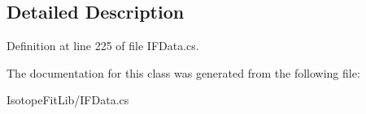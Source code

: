 \subsection{Detailed Description}


Definition at line 225 of file I\+F\+Data.\+cs.



The documentation for this class was generated from the following file\+:\begin{DoxyCompactItemize}
\item 
Isotope\+Fit\+Lib/I\+F\+Data.\+cs\end{DoxyCompactItemize}
